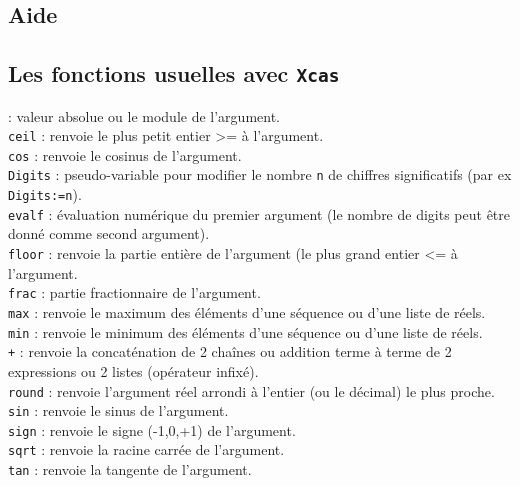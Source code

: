 \documentclass[12pt,a4paper]{book}
\begin{document}
\begin{giacjshere}
\chapter{Aide}
\section{Les fonctions usuelles avec {\tt Xcas}}
 : valeur absolue ou le module de l'argument.\\
{\tt ceil} : renvoie le plus petit entier >= \`a l'argument.\\
{\tt cos} : renvoie le cosinus de l'argument.\\
{\tt Digits} : pseudo-variable pour modifier le nombre {\tt n} de chiffres 
significatifs (par ex {\tt Digits:=n}).\\
{\tt evalf} : \'evaluation num\'erique du premier argument (le nombre de digits 
peut \^etre donn\'e comme second argument).\\
{\tt floor} : renvoie la partie enti\`ere de l'argument (le plus grand entier 
<= \`a l'argument.\\
{\tt frac} : partie fractionnaire de l'argument.\\
{\tt max} : renvoie le maximum des \'el\'ements d'une s\'equence ou d'une liste de r\'eels.\\
{\tt min} : renvoie le minimum des \'el\'ements d'une s\'equence ou d'une liste de r\'eels.\\
{\tt +} : renvoie la concat\'enation de 2 cha\^ines ou addition terme \`a terme 
de 2 expressions ou 2 listes (op\'erateur infix\'e).\\
{\tt round} : renvoie l'argument r\'eel arrondi \`a l'entier (ou le d\'ecimal)
le plus proche. \\
{\tt sin} : renvoie le sinus de l'argument.\\
{\tt sign} : renvoie le signe (-1,0,+1) de l'argument.\\
{\tt sqrt} : renvoie la racine carr\'ee de l'argument.\\
{\tt tan} : renvoie la tangente de l'argument.

\end{giacjshere}
\end{document}
